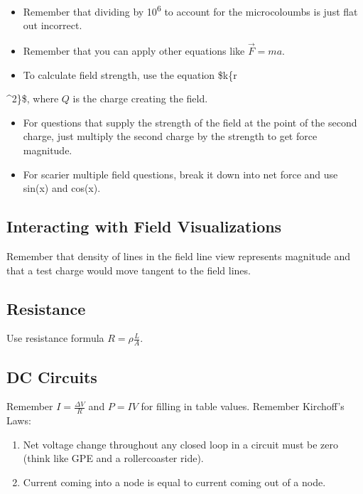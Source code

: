 \documentclass[letterpaper]{article}
\begin{document}
\begin{itemize}
\item Remember that dividing by 10\textsuperscript{6} to account for the microcoloumbs is just flat out incorrect.
\item Remember that you can apply other equations like \(\vec{F}=ma\).
\item To calculate field strength, use the equation \$k\{r
\end{itemize}
\^{}2\}\$, where \(Q\) is the charge creating the field.
\begin{itemize}
\item For questions that supply the strength of the field at the point of the second charge, just multiply the second charge by the strength to get force magnitude.
\item For scarier multiple field questions, break it down into net force and use sin(x) and cos(x).
\end{itemize}

\subsection{Interacting with Field Visualizations}
\label{sec:orge6cf541}
Remember that density of lines in the field line view represents magnitude and that a test charge would move tangent to the field lines.

\subsection{Resistance}
\label{sec:orgde7e533}
Use resistance formula \(R = \rho\frac{L}{A}\).

\subsection{DC Circuits}
\label{sec:org3b37ae8}
Remember \(I = \frac{\Delta V}{R}\) and \(P = IV\) for filling in table values.
Remember Kirchoff's Laws:
\begin{enumerate}
\item Net voltage change throughout any closed loop in a circuit must be zero (think like GPE and a rollercoaster ride).
\item Current coming into a node is equal to current coming out of a node.
\end{enumerate}
\end{document}
